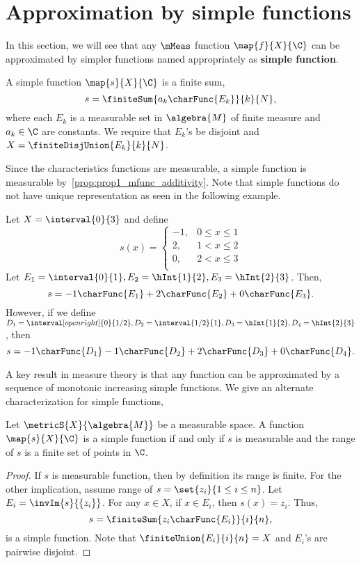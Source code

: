 \section{Approximation by simple functions}
In this section, we will see that any $\mMeas$ function $\map{f}{X}{\C}$ can be approximated by simpler
functions named appropriately as \textbf{simple function}. 
\begin{Definition}
    A simple function $\map{s}{X}{\C}$ is a finite sum,
    \[s = \finiteSum{a_k\charFunc{E_k}}{k}{N},\]
    where each $E_k$ is a measurable set in $\algebra{M}$ of finite measure and $a_k \in \C$ are constants. We
    require that $E_k$'s be disjoint and $X = \finiteDisjUnion{E_k}{k}{N}$.
\end{Definition}
Since the characteristics functions are measurable, a simple function is measurable
by~\ref{prop:prop1_mfunc_additivity}. Note that simple functions do not have unique representation as seen in
the following example.
\begin{Example}
    Let $X = \interval{0}{3}$ and define 
    \begin{equation*}
	s(x) = 
	\begin{cases}
	    -1, &0\leq x \leq 1 \\
	    2, & 1< x \leq 2 \\
	    0, & 2< x \leq 3 \\
	\end{cases}
    \end{equation*}
    Let $E_1 = \interval{0}{1}, E_2 = \hInt{1}{2} , E_3 = \hInt{2}{3}$. Then,
    \[s = -1\charFunc{E_1} + 2\charFunc{E_2} + 0\charFunc{E_3}.\]
    However, if we define $D_1 = \interval[open right]{0}{1/2}, D_2 = \interval{1/2}{1}, D_3 =\hInt{1}{2},
    D_4=\hInt{2}{3}$, then
    \[s = -1\charFunc{D_1} - 1\charFunc{D_2} + 2\charFunc{D_3} + 0\charFunc{D_4}.\]
\end{Example}
A key result in measure theory is that any function can be approximated by a sequence of monotonic increasing
simple functions. We give an alternate characterization for simple functions,
\begin{Proposition}\label{prop:characterization_simple_func}
    Let $\metricS{X}{\algebra{M}}$ be a measurable space. A function \break$\map{s}{X}{\C}$ is a simple 
    function if and only if $s$ is measurable and the range of $s$ is a finite set of points in $\C$. 
\end{Proposition}
\begin{proof}
    If $s$ is measurable function, then by definition its range is finite. For the other implication, assume
    range of $s = \set{z_i}{1\leq i\leq n}$. Let $E_i = \invIm{s}{\lbrace z_i\rbrace}$. For any $x \in X$, if
    $x\in E_i$, then $s(x) = z_i$. Thus,
    \[s = \finiteSum{z_i\charFunc{E_i}}{i}{n},\]
    is a simple function. Note that $\finiteUnion{E_i}{i}{n} = X$ and $E_i$'s are pairwise disjoint.
\end{proof}
